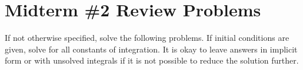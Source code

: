 \documentclass[letterpaper, fontsize=12pt]{scrartcl} %
\numberwithin{equation}{section} %
\numberwithin{figure}{section} %
\numberwithin{table}{section} %
\begin{document}

\newcommand{\horrule}[1]{\rule{\linewidth}{#1}} %


\section*{Midterm \#2 Review Problems}
\par If not otherwise specified, solve the following problems. If initial conditions are given, solve for all constants of integration. It is okay to leave answers in implicit form or with unsolved integrals if it is not possible to reduce the solution further. 
\end{document}
